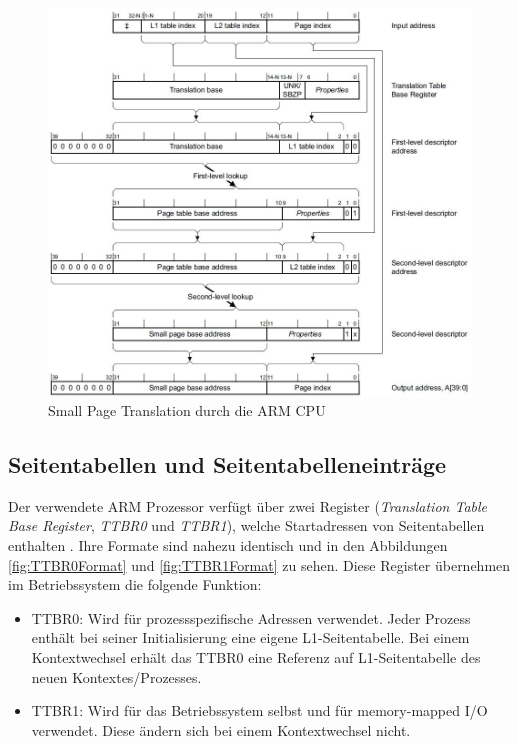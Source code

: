 \begin{figure}[H]
	\includegraphics[scale=0.8]{figures/smallPageTranslation}
	\caption{Small Page Translation durch die ARM CPU \cite[S. B3-1337]{ARM:ARM}}
	\label{fig:smallPageTranslation}
\end{figure}

\subsection{Seitentabellen und Seitentabelleneinträge}
\label{subsect:pageTables}

Der verwendete ARM Prozessor verfügt über zwei Register (\emph{Translation Table Base Register}, \emph{TTBR0} und \emph{TTBR1}), welche Startadressen von Seitentabellen enthalten  \cite[S. B3-1320]{ARM:ARM}. Ihre Formate sind nahezu identisch und in den Abbildungen \ref{fig:TTBR0Format} und \ref{fig:TTBR1Format} zu sehen. Diese Register übernehmen im Betriebssystem die folgende Funktion:

\begin{itemize}
	\item TTBR0: Wird für prozessspezifische Adressen verwendet. Jeder Prozess enthält bei seiner Initialisierung eine eigene L1-Seitentabelle. Bei einem Kontextwechsel erhält das TTBR0 eine Referenz auf L1-Seitentabelle des neuen Kontextes/Prozesses.
	\item TTBR1: Wird für das Betriebssystem selbst und für memory-mapped I/O verwendet. Diese ändern sich bei einem Kontextwechsel nicht.
\end{itemize}


